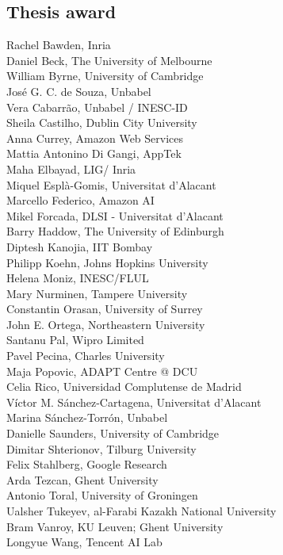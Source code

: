 \documentclass[a4paper,11pt,twoside]{book}
\begin{document}
\subsection*{Thesis award}
\noindent Rachel Bawden, Inria\\
\noindent Daniel Beck, The University of Melbourne\\
\noindent William Byrne, University of Cambridge\\
\noindent José G. C. de Souza, Unbabel\\
\noindent Vera Cabarrão, Unbabel / INESC-ID\\
\noindent Sheila Castilho, Dublin City University\\
\noindent Anna Currey, Amazon Web Services\\
\noindent Mattia Antonino Di Gangi, AppTek\\
\noindent Maha Elbayad, LIG/ Inria\\
\noindent Miquel Esplà-Gomis, Universitat d'Alacant\\
\noindent Marcello Federico, Amazon AI\\
\noindent Mikel Forcada, DLSI - Universitat d'Alacant\\
\noindent Barry Haddow, The University of Edinburgh\\
\noindent Diptesh Kanojia, IIT Bombay\\
\noindent Philipp Koehn, Johns Hopkins University\\
\noindent Helena Moniz, INESC/FLUL\\
\noindent Mary Nurminen, Tampere University\\
\noindent Constantin Orasan, University of Surrey\\
\noindent John E. Ortega, Northeastern University\\
\noindent Santanu Pal, Wipro Limited\\
\noindent Pavel Pecina, Charles University\\
\noindent Maja Popovic, ADAPT Centre @ DCU\\
\noindent Celia Rico, Universidad Complutense de Madrid\\
\noindent Víctor M. Sánchez-Cartagena, Universitat d'Alacant\\
\noindent Marina Sánchez-Torrón, Unbabel\\
\noindent Danielle Saunders, University of Cambridge\\
\noindent Dimitar Shterionov, Tilburg University\\
\noindent Felix Stahlberg, Google Research\\
\noindent Arda Tezcan, Ghent University\\
\noindent Antonio Toral, University of Groningen\\
\noindent Ualsher Tukeyev, al-Farabi Kazakh National University\\
\noindent Bram Vanroy, KU Leuven; Ghent University\\
\noindent Longyue Wang, Tencent AI Lab\\
\end{document}
